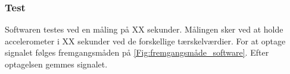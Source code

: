 \subsubsection{Test}
Softwaren testes ved en måling på XX sekunder. Målingen sker ved at holde accelerometer i XX sekunder ved de forskellige tærskelværdier. For at optage signalet følges fremgangsmåden på \ref{Fig:fremgangsmåde_software}. Efter optagelsen gemmes signalet.





